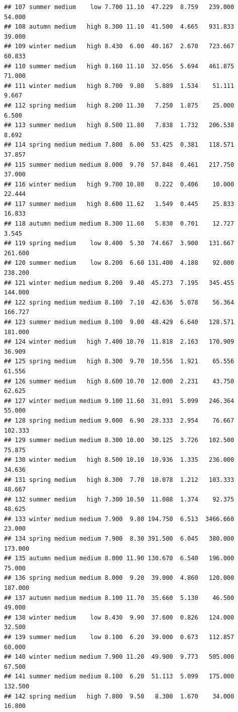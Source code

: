 \documentclass[]{report}
\begin{document}
\begin{verbatim}
## 107 summer medium    low 7.700 11.10  47.229  8.759   239.000  54.000
## 108 autumn medium   high 8.300 11.10  41.500  4.665   931.833  39.000
## 109 winter medium   high 8.430  6.00  40.167  2.670   723.667  60.833
## 110 summer medium   high 8.160 11.10  32.056  5.694   461.875  71.000
## 111 winter medium   high 8.700  9.80   5.889  1.534    51.111   9.667
## 112 spring medium   high 8.200 11.30   7.250  1.875    25.000   6.500
## 113 summer medium   high 8.500 11.80   7.838  1.732   206.538   8.692
## 114 spring medium medium 7.800  6.00  53.425  0.381   118.571  37.857
## 115 summer medium medium 8.000  9.70  57.848  0.461   217.750  37.000
## 116 winter medium   high 9.700 10.80   0.222  0.406    10.000  22.444
## 117 summer medium   high 8.600 11.62   1.549  0.445    25.833  16.833
## 118 autumn medium medium 8.300 11.60   5.830  0.701    12.727   3.545
## 119 spring medium    low 8.400  5.30  74.667  3.900   131.667 261.600
## 120 summer medium    low 8.200  6.60 131.400  4.188    92.000 238.200
## 121 winter medium medium 8.200  9.40  45.273  7.195   345.455 144.000
## 122 spring medium medium 8.100  7.10  42.636  5.078    56.364 166.727
## 123 summer medium medium 8.100  9.00  48.429  6.640   128.571 181.000
## 124 winter medium   high 7.400 10.70  11.818  2.163   170.909  36.909
## 125 spring medium   high 8.300  9.70  10.556  1.921    65.556  61.556
## 126 summer medium   high 8.600 10.70  12.000  2.231    43.750  62.625
## 127 winter medium medium 9.100 11.60  31.091  5.099   246.364  55.000
## 128 spring medium medium 9.000  6.90  28.333  2.954    76.667 102.333
## 129 summer medium medium 8.300 10.00  30.125  3.726   102.500  75.875
## 130 winter medium   high 8.500 10.10  10.936  1.335   236.000  34.636
## 131 spring medium   high 8.300  7.70  10.078  1.212   103.333  48.667
## 132 summer medium   high 7.300 10.50  11.088  1.374    92.375  48.625
## 133 winter medium medium 7.900  9.80 194.750  6.513  3466.660  23.000
## 134 spring medium medium 7.900  8.30 391.500  6.045   380.000 173.000
## 135 autumn medium medium 8.000 11.90 130.670  6.540   196.000  75.000
## 136 spring medium medium 8.000  9.20  39.000  4.860   120.000 187.000
## 137 autumn medium medium 8.100 11.70  35.660  5.130    46.500  49.000
## 138 winter medium    low 8.430  9.90  37.600  0.826   124.000  32.500
## 139 summer medium    low 8.100  6.20  39.000  0.673   112.857  60.000
## 140 winter medium medium 7.900 11.20  49.900  9.773   505.000  67.500
## 141 summer medium medium 8.100  6.20  51.113  5.099   175.000 132.500
## 142 spring medium   high 7.800  9.50   8.300  1.670    34.000  16.800

\end{verbatim}
\end{document}
